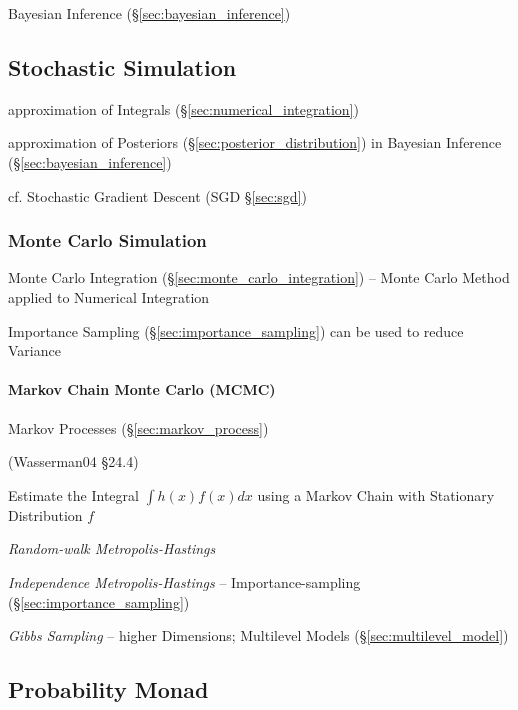 Bayesian Inference (\S\ref{sec:bayesian_inference})



\subsection{Stochastic Simulation}\label{sec:stochastic_simulation}

approximation of Integrals (\S\ref{sec:numerical_integration})

approximation of Posteriors (\S\ref{sec:posterior_distribution}) in Bayesian
Inference (\S\ref{sec:bayesian_inference})

cf. Stochastic Gradient Descent (SGD \S\ref{sec:sgd})



\subsubsection{Monte Carlo Simulation}\label{sec:monte_carlo}

Monte Carlo Integration (\S\ref{sec:monte_carlo_integration}) -- Monte Carlo
Method applied to Numerical Integration

Importance Sampling (\S\ref{sec:importance_sampling}) can be used to reduce
Variance



\paragraph{Markov Chain Monte Carlo (MCMC)}\label{sec:mcmc}\hfill

Markov Processes (\S\ref{sec:markov_process})

(Wasserman04 \S24.4)

Estimate the Integral $\int h(x) f(x) dx$ using a Markov Chain with Stationary
Distribution $f$

\emph{Random-walk Metropolis-Hastings}

\emph{Independence Metropolis-Hastings} -- Importance-sampling
(\S\ref{sec:importance_sampling})

\emph{Gibbs Sampling} -- higher Dimensions; Multilevel Models
(\S\ref{sec:multilevel_model})



\subsection{Probability Monad}\label{sec:probability_monad}

